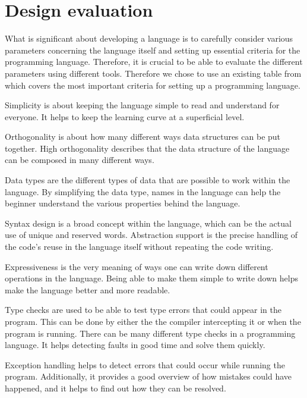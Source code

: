 \section{Design evaluation} \label{chap:design evaluation}
What is significant about developing a language is to carefully consider various parameters concerning the language itself and setting up essential criteria for the programming language. 
Therefore, it is crucial to be able to evaluate the different parameters using different tools. Therefore we chose to use an existing table from \cite{sebesta_concepts_2016} which covers the most important criteria for setting up a programming language. 




Simplicity is about keeping the language simple to read and understand for everyone. It helps to keep the learning curve at a superficial level.

Orthogonality is about how many different ways data structures can be put together. High orthogonality describes that the data structure of the language can be composed in many different ways.

Data types are the different types of data that are possible to work within the language. By simplifying the data type, names in the language can help the beginner understand the various properties behind the language.

Syntax design is a broad concept within the language, which can be the actual use of unique and reserved words.
Abstraction support is the precise handling of the code's reuse in the language itself without repeating the code writing.

Expressiveness is the very meaning of ways one can write down different operations in the language. Being able to make them simple to write down helps make the language better and more readable.

Type checks are used to be able to test type errors that could appear in the program. This can be done by either the the compiler intercepting it or when the program is running. There can be many different type checks in a programming language. It helps detecting faults in good time and solve them quickly.

Exception handling helps to detect errors that could occur while running the program. Additionally, it provides a good overview of how mistakes could have happened, and it helps to find out how they can be resolved.

